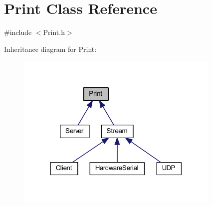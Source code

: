 \hypertarget{class_print}{}\section{Print Class Reference}
\label{class_print}


{\ttfamily \#include $<$Print.\+h$>$}



Inheritance diagram for Print\+:\nopagebreak
\begin{figure}[H]
\begin{center}
\leavevmode
\includegraphics[width=277pt]{class_print__inherit__graph}
\end{center}
\end{figure}
